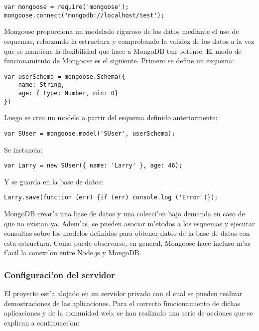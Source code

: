 \begin{verbatim}
var mongoose = require('mongoose');
mongoose.connect('mongodb://localhost/test');
\end{verbatim}

Mongoose proporciona un modelado riguroso de los datos mediante el uso de esquemas, reforzando la estructura
y comprobando la validez de los datos a la vez que se mantiene la flexibilidad que hace a MongoDB tan
potente. El modo de funcionamiento de Mongoose es el siguiente. Primero se define un esquema:

\begin{verbatim}
var userSchema = mongoose.Schema({
    name: String,
    age: { type: Number, min: 0}
})
\end{verbatim}

Luego se crea un modelo a partir del esquema definido anteriormente:

\begin{verbatim}
var SUser = mongoose.model('SUser', userSchema);
\end{verbatim}

Se instancia:

\begin{verbatim}
var Larry = new SUser({ name: 'Larry' }, age: 46);
\end{verbatim}

Y se guarda en la base de datos:

\begin{verbatim}
Larry.save(function (err) {if (err) console.log ('Error')});
\end{verbatim}

MongoDB crear'a una base de datos y una colecci'on bajo demanda en caso de que no existan ya. Adem'as, se pueden
asociar m'etodos a los esquemas y ejecutar consultas sobre los modelos definidos para obtener datos de la base
de datos con esta estructura. Como puede observarse, en general, Mongoose hace incluso m'as f'acil la conexi'on
entre Node.js y MongoDB.


\subsubsection[Configuraci'on del servidor (FDB)]{Configuraci'on del servidor}
\label{sub:configuracion_del_servidor}
El proyecto \Nipponline{} est'a alojado en un servidor privado con el cual se pueden realizar demostraciones de las aplicaciones.
Para el correcto funcionamiento de dichas aplicaciones y de la comunidad web, se han realizado una serie de acciones que se explican 
a continuaci'on:
